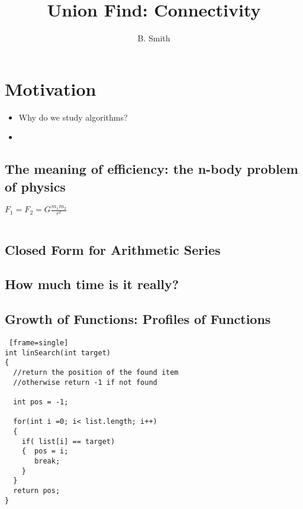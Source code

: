 \documentclass[14pt]{article} %
\title{Union Find: Connectivity}
\author{B. Smith}
\begin{document}
\maketitle

\section{Motivation}

\begin{itemize}
\item Why do we study algorithms?  
\item 

\end{itemize}

\subsection{The meaning of efficiency: the n-body problem of physics }


\begin{center}
$F_1 = F_2 = G \frac{m_1 m_2}{r^2}$
\end{center}



\begin{verbatim}
\end{verbatim}



\subsection{Closed Form for Arithmetic Series}


\subsection{How much time is it really?}



\subsection{Growth of Functions: Profiles of Functions}

\begin{lstlisting} [frame=single]
int linSearch(int target)
{
  //return the position of the found item
  //otherwise return -1 if not found

  int pos = -1;

  for(int i =0; i< list.length; i++)
  {
    if( list[i] == target)
    {  pos = i;
       break;
    }
  }
  return pos;
}
\end{lstlisting}
\end{document}
